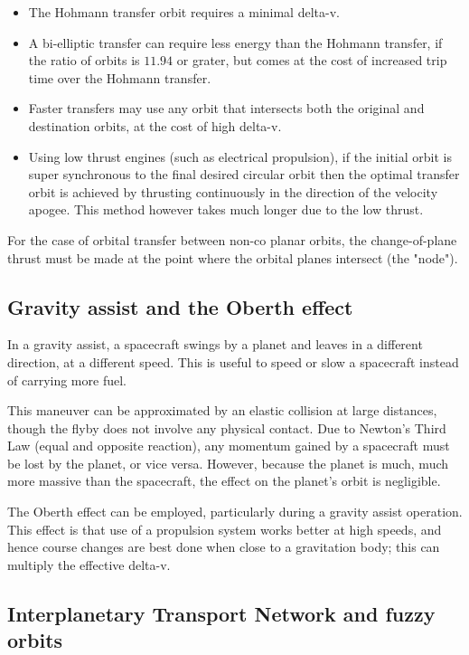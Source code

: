 \documentclass[12pt]{article}
\begin{document}
\begin{itemize}
  \item The Hohmann transfer orbit requires a minimal delta-v.
  \item A bi-elliptic transfer can require less energy than the Hohmann
    transfer, if the ratio of orbits is \(11.94\) or grater, but comes at the
    cost of increased trip time over the Hohmann transfer.
  \item Faster transfers may use any orbit that intersects both the original
    and destination orbits, at the cost of high delta-v.
  \item Using low thrust engines (such as electrical propulsion), if the
    initial orbit is super synchronous to the final desired circular orbit then
    the optimal transfer orbit is achieved by thrusting continuously in the
    direction of the velocity apogee. This method however takes much longer due
    to the low thrust.
\end{itemize}

For the case of orbital transfer between non-co planar orbits, the
change-of-plane thrust must be made at the point where the orbital planes
intersect (the "node").

\subsection{Gravity assist and the Oberth effect}

In a gravity assist, a spacecraft swings by a planet and leaves in a different
direction, at a different speed. This is useful to speed or slow a spacecraft
instead of carrying more fuel.

This maneuver can be approximated by an elastic collision at large distances,
though the flyby does not involve any physical contact. Due to Newton's Third
Law (equal and opposite reaction), any momentum gained by a spacecraft must be
lost by the planet, or vice versa. However, because the planet is much, much
more massive than the spacecraft, the effect on the planet's orbit is
negligible.

The Oberth effect can be employed, particularly during a gravity assist
operation. This effect is that use of a propulsion system works better at high
speeds, and hence course changes are best done when close to a gravitation
body; this can multiply the effective delta-v.

\subsection{Interplanetary Transport Network and fuzzy orbits}
\end{document}
